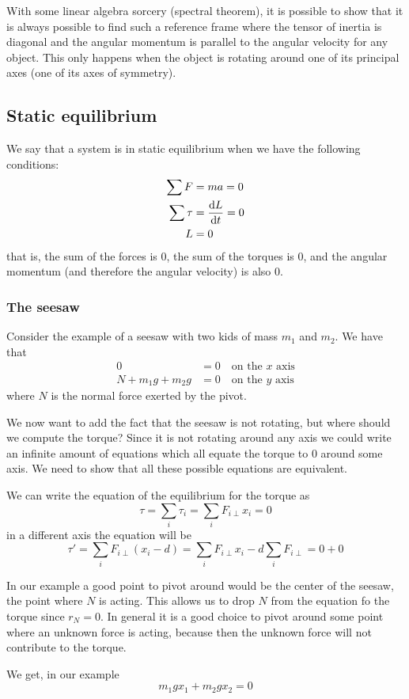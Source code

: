 \documentclass[12pt]{extarticle}
\begin{document}
With some linear algebra sorcery (spectral theorem), it is possible to show that it is always possible to find such a reference frame where the tensor of inertia is diagonal and the angular momentum is parallel to the angular velocity for any object.
This only happens when the object is rotating around one of its principal axes (one of its axes of symmetry).


\subsection{Static equilibrium}

We say that a system is in static equilibrium when we have the following conditions:
\begin{align}
    \sum F    & = ma = 0        \\
    \sum \tau & = \dv{L}{t} = 0 \\
    L         & = 0
\end{align}
that is, the sum of the forces is $0$, the sum of the torques is $0$, and the angular momentum (and therefore the angular velocity) is also $0$.

\subsubsection{The seesaw}

Consider the example of a seesaw with two kids of mass $m_1$ and $m_2$.
We have that
\begin{align}
    0                 & = 0 \quad \text{on the $x$ axis} \\
    N + m_1 g + m_2 g & = 0 \quad \text{on the $y$ axis}
\end{align}
where $N$ is the normal force exerted by the pivot.

We now want to add the fact that the seesaw is not rotating, but where should we compute the torque?
Since it is not rotating around any axis we could write an infinite amount of equations which all equate the torque to $0$ around some axis.
We need to show that all these possible equations are equivalent.

We can write the equation of the equilibrium for the torque as
\begin{equation}
    \tau = \sum_i \tau_i = \sum_i F_{i \perp} x_i = 0
\end{equation}
in a different axis the equation will be
\begin{equation}
    \tau' = \sum_i F_{i \perp} (x_i - d) = \sum_i F_{i \perp} x_i - d \sum_i F_{i \perp} = 0 + 0
\end{equation}

In our example a good point to pivot around would be the center of the seesaw, the point where $N$ is acting.
This allows us to drop $N$ from the equation fo the torque since $r_N = 0$.
In general it is a good choice to pivot around some point where an unknown force is acting, because then the unknown force will not contribute to the torque.

We get, in our example
\begin{equation}
    m_1 g x_1 + m_2 g x_2 = 0
\end{equation}
\end{document}
